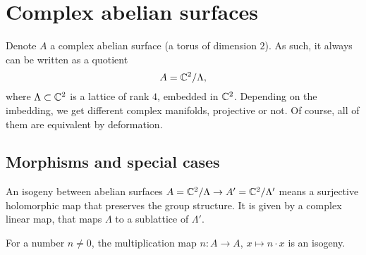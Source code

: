 \section{Complex abelian surfaces}\label{AbelianSection}
Denote $A$ a complex abelian surface (a torus of dimension $2$). As such, it always can be written as a quotient
$$
A = \mathbb{C}^2/\Lambda,
$$
where $\Lambda\subset \mathbb{C}^2$ is a lattice of rank $4$, embedded in $\mathbb{C}^2$. 
Depending on the imbedding, we get different complex manifolds, projective or not. Of course, all of them are equivalent by deformation.
\subsection{Morphisms and special cases}
\begin{definition}
An isogeny between abelian surfaces $A=\mathbb{C}^2/\Lambda\rightarrow A'=\mathbb{C}^2/\Lambda'$ means a surjective holomorphic map that preserves the group structure. It is given by a complex linear map, that maps $\Lambda$ to a sublattice of $\Lambda'$. 
\end{definition}
\begin{example}
For a number $n\neq 0$, the multiplication map $n: A\rightarrow A$, $x\mapsto n\cdot x$ is an isogeny.
\end{example}


